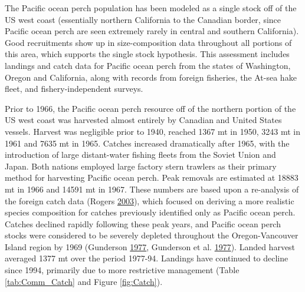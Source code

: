 \documentclass[12pt,]{article}
\begin{document}
The Pacific ocean perch population has been modeled as a single stock
off of the US west coast (essentially northern California to the
Canadian border, since Pacific ocean perch are seen extremely rarely in
central and southern California). Good recruitments show up in
size-composition data throughout all portions of this area, which
supports the single stock hypothesis. This assessment includes landings
and catch data for Pacific ocean perch from the states of Washington,
Oregon and California, along with records from foreign fisheries, the
At-sea hake fleet, and fishery-independent surveys.

Prior to 1966, the Pacific ocean perch resource off of the northern
portion of the US west coast was harvested almost entirely by Canadian
and United States vessels. Harvest was negligible prior to 1940, reached
1367 mt in 1950, 3243 mt in 1961 and 7635 mt in 1965. Catches increased
dramatically after 1965, with the introduction of large distant-water
fishing fleets from the Soviet Union and Japan. Both nations employed
large factory stern trawlers as their primary method for harvesting
Pacific ocean perch. Peak removals are estimated at 18883 mt in 1966 and
14591 mt in 1967. These numbers are based upon a re-analysis of the
foreign catch data (Rogers
\protect\hyperlink{ref-rogers_species_2003}{2003}), which focused on
deriving a more realistic species composition for catches previously
identified only as Pacific ocean perch. Catches declined rapidly
following these peak years, and Pacific ocean perch stocks were
considered to be severely depleted throughout the Oregon-Vancouver
Island region by 1969 (Gunderson
\protect\hyperlink{ref-gunderson_population_1977}{1977}, Gunderson et
al. \protect\hyperlink{ref-gunderson_status_1977}{1977}). Landed harvest
averaged 1377 mt over the period 1977-94. Landings have continued to
decline since 1994, primarily due to more restrictive management (Table
\ref{tab:Comm_Catch} and Figure \ref{fig:Catch}).
\end{document}
